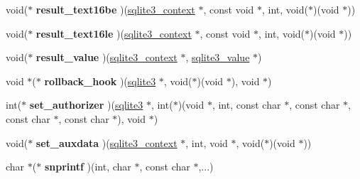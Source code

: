 \begin{DoxyCompactItemize}
\item 
void($\ast$ {\bfseries result\+\_\+text16be} )(\hyperlink{structsqlite3__context}{sqlite3\+\_\+context} $\ast$, const void $\ast$, int, void($\ast$)(void $\ast$))\hypertarget{structsqlite3__api__routines_a328415dd9961d9e0d6b15a76fe134b9d}{}\label{structsqlite3__api__routines_a328415dd9961d9e0d6b15a76fe134b9d}

\item 
void($\ast$ {\bfseries result\+\_\+text16le} )(\hyperlink{structsqlite3__context}{sqlite3\+\_\+context} $\ast$, const void $\ast$, int, void($\ast$)(void $\ast$))\hypertarget{structsqlite3__api__routines_ac8f4c207ad255db5b0f8e0974fdcba16}{}\label{structsqlite3__api__routines_ac8f4c207ad255db5b0f8e0974fdcba16}

\item 
void($\ast$ {\bfseries result\+\_\+value} )(\hyperlink{structsqlite3__context}{sqlite3\+\_\+context} $\ast$, \hyperlink{structMem}{sqlite3\+\_\+value} $\ast$)\hypertarget{structsqlite3__api__routines_ae1ff210b0883098bb16c807e0dae6a80}{}\label{structsqlite3__api__routines_ae1ff210b0883098bb16c807e0dae6a80}

\item 
void $\ast$($\ast$ {\bfseries rollback\+\_\+hook} )(\hyperlink{structsqlite3}{sqlite3} $\ast$, void($\ast$)(void $\ast$), void $\ast$)\hypertarget{structsqlite3__api__routines_aad7da0801b4d34761606cbcd827069c9}{}\label{structsqlite3__api__routines_aad7da0801b4d34761606cbcd827069c9}

\item 
int($\ast$ {\bfseries set\+\_\+authorizer} )(\hyperlink{structsqlite3}{sqlite3} $\ast$, int($\ast$)(void $\ast$, int, const char $\ast$, const char $\ast$,                                                                                           const char $\ast$, const char $\ast$), void $\ast$)\hypertarget{structsqlite3__api__routines_a5fca5037d71f40a5f9006bbb4ea0686f}{}\label{structsqlite3__api__routines_a5fca5037d71f40a5f9006bbb4ea0686f}

\item 
void($\ast$ {\bfseries set\+\_\+auxdata} )(\hyperlink{structsqlite3__context}{sqlite3\+\_\+context} $\ast$, int, void $\ast$, void($\ast$)(void $\ast$))\hypertarget{structsqlite3__api__routines_a71c6f4befd8497adcf3bd78b720d4c6d}{}\label{structsqlite3__api__routines_a71c6f4befd8497adcf3bd78b720d4c6d}

\item 
char $\ast$($\ast$ {\bfseries snprintf} )(int, char $\ast$, const char $\ast$,...)\hypertarget{structsqlite3__api__routines_a62361d39ccea7e307358bbf1c10a10ec}{}\label{structsqlite3__api__routines_a62361d39ccea7e307358bbf1c10a10ec}


\end{DoxyCompactItemize}
